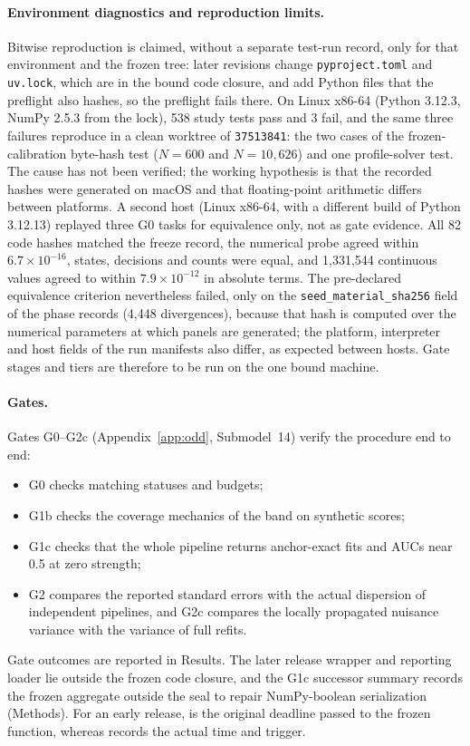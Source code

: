 \paragraph{Environment diagnostics and reproduction limits.}
Bitwise reproduction is claimed, without a separate test-run record, only for that environment and the frozen tree: later revisions change \texttt{pyproject.toml} and \texttt{uv.lock}, which are in the bound code closure, and add Python files that the preflight also hashes, so the preflight fails there. %
On Linux x86-64 (Python 3.12.3, NumPy 2.5.3 from the lock), 538 study tests pass and 3 fail, and the same three failures reproduce in a clean worktree of \texttt{37513841}: the two cases of the frozen-calibration byte-hash test ($N=600$ and $N=10{,}626$) and one profile-solver test. %
The cause has not been verified; the working hypothesis is that the recorded hashes were generated on macOS and that floating-point arithmetic differs between platforms. %
A second host (Linux x86-64, with a different build of Python 3.12.13) replayed three G0 tasks for equivalence only, not as gate evidence. %
All 82 code hashes matched the freeze record, the numerical probe agreed within $6.7\times10^{-16}$, states, decisions and counts were equal, and 1,331,544 continuous values agreed to within $7.9\times10^{-12}$ in absolute terms. %
The pre-declared equivalence criterion nevertheless failed, only on the \texttt{seed\_material\_sha256} field of the phase records (4,448 divergences), because that hash is computed over the numerical parameters at which panels are generated; the platform, interpreter and host fields of the run manifests also differ, as expected between hosts. %
Gate stages and tiers are therefore to be run on the one bound machine. %

\paragraph{Gates.}
Gates G0--G2c (Appendix~\ref{app:odd}, Submodel~14) verify the procedure end to end:
\begin{itemize}
\item G0 checks matching statuses and budgets;
\item G1b checks the coverage mechanics of the band on synthetic scores;
\item G1c checks that the whole pipeline returns anchor-exact fits and AUCs near 0.5 at zero strength;
\item G2 compares the reported standard errors with the actual dispersion of independent pipelines, and G2c compares the locally propagated nuisance variance with the variance of full refits.
\end{itemize}
Gate outcomes are reported in Results.
The later release wrapper and reporting loader lie outside the frozen code closure, and the G1c successor summary records the frozen aggregate outside the seal to repair NumPy-boolean serialization (Methods).
For an early release,  is the original deadline passed to the frozen function, whereas  records the actual time and trigger.

